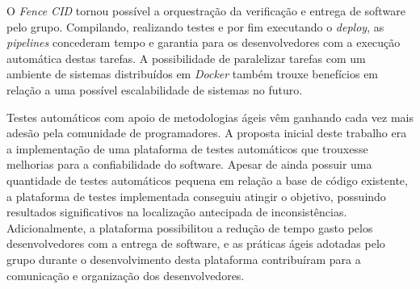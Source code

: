 O \emph{Fence CID} tornou possível a orquestração da verificação e entrega de software pelo grupo. Compilando, realizando testes e por fim executando o \emph{deploy}, as \emph{pipelines} concederam tempo e garantia para os desenvolvedores com a execução automática destas tarefas. A possibilidade de paralelizar tarefas com um ambiente de sistemas distribuídos em \emph{Docker} também trouxe benefícios em relação a uma possível escalabilidade de sistemas no futuro.

Testes automáticos com apoio de metodologias ágeis vêm ganhando cada vez mais adesão pela comunidade de programadores. A proposta inicial deste trabalho era a implementação de uma plataforma de testes automáticos que trouxesse melhorias para a confiabilidade do software. Apesar de ainda possuir uma quantidade de testes automáticos pequena em relação a base de código existente, a plataforma de testes implementada conseguiu atingir o objetivo, possuindo resultados significativos na localização antecipada de inconsistências. Adicionalmente, a plataforma possibilitou a redução de tempo gasto pelos desenvolvedores com a entrega de software, e as práticas ágeis adotadas pelo grupo durante o desenvolvimento desta plataforma contribuíram para a comunicação e organização dos desenvolvedores.

